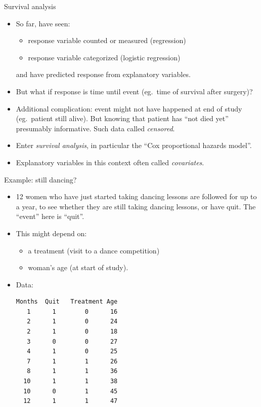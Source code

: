 \documentclass[unknownkeysallowed]{beamer}\usepackage[]{graphicx}\usepackage[]{color}
\begin{document}
\begin{frame}[fragile]{Survival analysis}

  \begin{itemize}
  \item So far, have seen:
    \begin{itemize}
    \item response variable counted or measured (regression)
    \item response variable categorized (logistic regression)
    \end{itemize}
    and have predicted response from explanatory variables.
  \item But what if response is time until event (eg.\ time of
    survival after surgery)?
  \item Additional complication: event might not have happened at end of study (eg.\ patient still alive). But knowing that patient has ``not died yet'' presumably informative. Such data called {\em censored}. 
  \item Enter {\em survival analysis}, in particular the ``Cox proportional hazards model''. 
  \item Explanatory variables in this context often called {\em covariates}.
  \end{itemize}

\end{frame}

\begin{frame}[fragile]{Example: still dancing?}

  \begin{itemize}
  \item 12 women who have just started taking dancing lessons are
    followed for up to a year, to see whether they are still taking
    dancing lessons, or have quit. The ``event'' here is ``quit''.
  \item This might depend on:
    \begin{itemize}
    \item a treatment (visit to a dance competition)
    \item woman's age (at start of study).
    \end{itemize}
  \item Data:

{\scriptsize
\begin{verbatim}
Months  Quit   Treatment Age
   1      1        0      16
   2      1        0      24
   2      1        0      18
   3      0        0      27
   4      1        0      25
   7      1        1      26
   8      1        1      36
  10      1        1      38
  10      0        1      45
  12      1        1      47
\end{verbatim}
}

  \end{itemize}
  
\end{frame}
 
\end{document}
